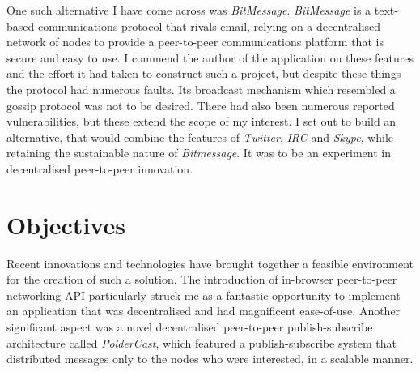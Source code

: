 \documentclass[10pt,a4paper,onecolumn]{article}
\begin{document}
One such alternative I have come across was \emph{BitMessage}. \emph{BitMessage} is a text-based communications protocol that rivals email, relying on a decentralised network of nodes to provide a peer-to-peer communications platform that is secure and easy to use. I commend the author of the application on these features and the effort it had taken to construct such a project, but despite these things the protocol had numerous faults. Its broadcast mechanism which resembled a gossip protocol was not to be desired. There had also been numerous reported vulnerabilities, but these extend the scope of my interest. I set out to build an alternative, that would combine the features of \emph{Twitter}, \emph{IRC} and \emph{Skype}, while retaining the sustainable nature of \emph{Bitmessage}. It was to be an experiment in decentralised peer-to-peer innovation.

\section{Objectives}
Recent innovations and technologies have brought together a feasible environment for the creation of such a solution. The introduction of in-browser peer-to-peer networking API particularly struck me as a fantastic opportunity to implement an application that was decentralised and had magnificent ease-of-use. Another significant aspect was a novel decentralised peer-to-peer publish-subscribe architecture called \textit{PolderCast}, which featured a publish-subscribe system that distributed messages only to the nodes who were interested, in a scalable manner.
\end{document}
